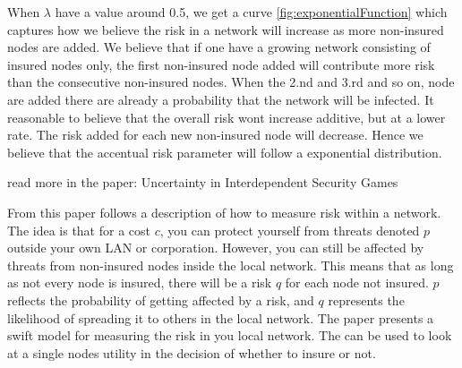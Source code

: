 When $\lambda$ have a value around 0.5, we get a curve \ref{fig:exponentialFunction} which captures how we believe the risk in a network will increase as more non-insured nodes are added. We believe that if one have a growing network consisting of insured nodes only, the first non-insured node added will contribute more risk than the consecutive non-insured nodes. When the 2.nd and 3.rd and so on, node are added there are already a probability that the network will be infected. It reasonable to believe that the overall risk wont increase additive, but at a lower rate. The risk added for each new non-insured node will decrease. Hence we believe that the accentual risk parameter will follow a exponential distribution. 

read more in the paper: Uncertainty in Interdependent Security Games

From this paper follows a description of how to measure risk within a network. The idea is that for a cost $c$, you can protect yourself from threats denoted $p$ outside your own LAN or corporation. However, you can still be affected by threats from non-insured nodes inside the local network. This means that as long as not every node is insured, there will be a risk $q$ for each node not insured. $p$ reflects the probability of getting affected by a risk, and $q$ represents the likelihood of spreading it to others in the local network. The paper presents a swift model for measuring the risk in you local network. The can be used to look at a single nodes utility in the decision of whether to insure or not. 